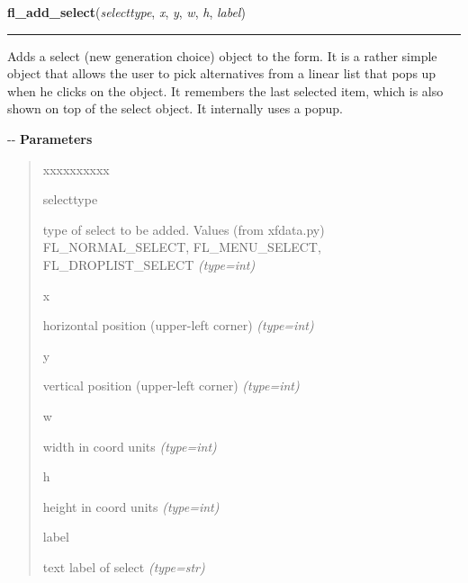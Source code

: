     \vspace{0.5ex}

\hspace{.8\funcindent}\begin{boxedminipage}{\funcwidth}

    \raggedright \textbf{fl\_add\_select}(\textit{selecttype}, \textit{x}, \textit{y}, \textit{w}, \textit{h}, \textit{label})

    \vspace{-1.5ex}

    \rule{\textwidth}{0.5\fboxrule}
\setlength{\parskip}{2ex}

Adds a select (new generation choice) object to the form. It is a
rather simple object that allows the user to pick alternatives from a
linear list that pops up when he clicks on the object. It remembers the
last selected item, which is also shown on top of the select object. It
internally uses a popup.

-{}-
\setlength{\parskip}{1ex}
      \textbf{Parameters}
      \vspace{-1ex}

      \begin{quote}
        \begin{Ventry}{xxxxxxxxxx}

          \item[selecttype]


type of select to be added. Values (from xfdata.py) FL\_NORMAL\_SELECT,
FL\_MENU\_SELECT, FL\_DROPLIST\_SELECT
            {\it (type=int)}

          \item[x]


horizontal position (upper-left corner)
            {\it (type=int)}

          \item[y]


vertical position (upper-left corner)
            {\it (type=int)}

          \item[w]


width in coord units
            {\it (type=int)}

          \item[h]


height in coord units
            {\it (type=int)}

          \item[label]


text label of select
            {\it (type=str)}


\end{Ventry}
\end{quote}
\end{boxedminipage}
